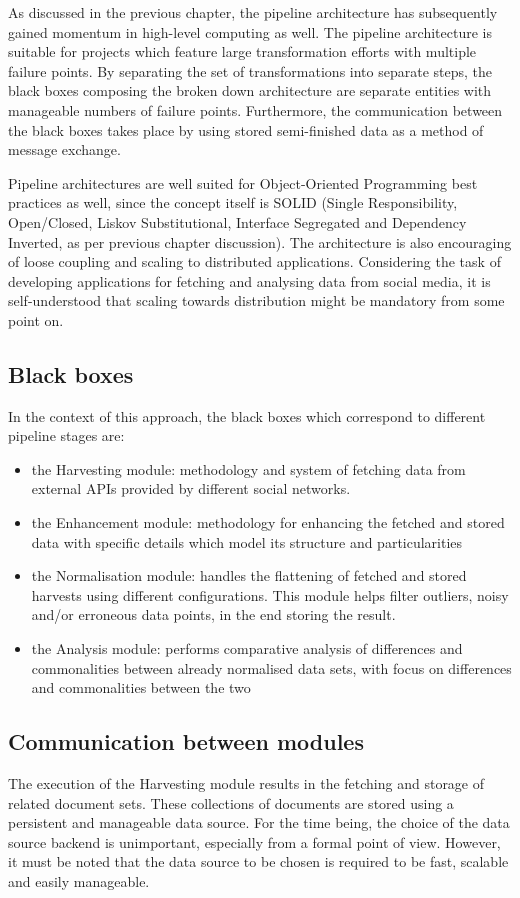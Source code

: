 \documentclass[12pt,a4paper,twoside]{report}
\begin{document}
As discussed in the previous chapter, the pipeline architecture has subsequently gained momentum in high-level computing as well. The pipeline architecture is suitable for projects which feature large transformation efforts with multiple failure points. By separating the set of transformations into separate steps, the black boxes composing the broken down architecture are separate entities with manageable numbers of failure points. Furthermore, the communication between the black boxes takes place by using stored semi-finished data as a method of message exchange.

Pipeline architectures are well suited for Object-Oriented Programming best practices as well, since the concept itself is SOLID (Single Responsibility, Open/Closed, Liskov Substitutional, Interface Segregated and Dependency Inverted, as per previous chapter discussion). The architecture is also encouraging of loose coupling and scaling to distributed applications. Considering the task of developing applications for fetching and analysing data from social media, it is self-understood that scaling towards distribution might be mandatory from some point on.

\subsection{Black boxes}
In the context of this approach, the black boxes which correspond to different pipeline stages are:

\begin{itemize}
\item the Harvesting module: methodology and system of fetching data from external APIs provided by different social networks.
\item the Enhancement module: methodology for enhancing the fetched and stored data with specific details which model its structure and particularities
\item the Normalisation module: handles the flattening of fetched and stored harvests using different configurations. This module helps filter outliers, noisy and/or erroneous data points, in the end storing the result.
\item the Analysis module: performs comparative analysis of differences and commonalities between already normalised data sets, with focus on differences and commonalities between the two
\end{itemize}

\subsection{Communication between modules}
The execution of the Harvesting module results in the fetching and storage of related document sets. These collections of documents are stored using a persistent and manageable data source. For the time being, the choice of the data source backend is unimportant, especially from a formal point of view. However, it must be noted that the data source to be chosen is required to be fast, scalable and easily manageable.
\end{document}
